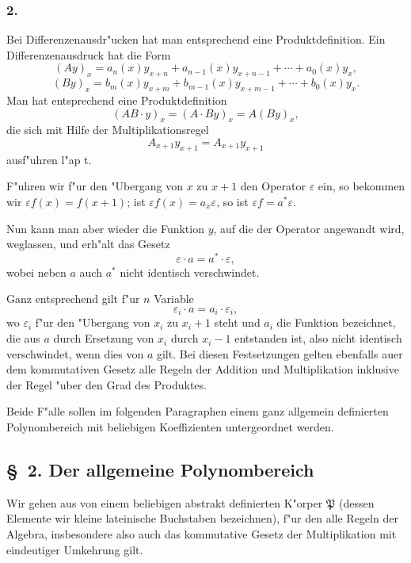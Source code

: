 \documentclass[12pt,a4paper]{article}
\begin{document}
\subsubsection*{2.}

Bei Differenzenausdr"ucken hat man entsprechend eine Produktdefinition. Ein Differenzenausdruck hat die Form
\[
(Ay)_x = a_n(x) y_{x+n} + a_{n-1}(x) y_{x+n-1} + \cdots + a_0(x) y_x,
\]
\[
(By)_x = b_m(x) y_{x+m} + b_{m-1}(x) y_{x+m-1} + \cdots + b_0(x) y_x.
\]
Man hat entsprechend eine Produktdefinition
\begin{equation}
(AB\cdot y)_x = (A\cdot By)_x = A(By)_x,
\end{equation}
die sich mit Hilfe der Multiplikationsregel
\[
A_{x+1} y_{x+1} = A_{x+1} y_{x+1}
\]
ausf"uhren l"ap t.

F"uhren wir f"ur den "Ubergang von $x$ zu $x+1$ den Operator $\varepsilon$ ein, so bekommen wir $\varepsilon f(x) = f(x+1)$; ist $\varepsilon f(x) = a_x \varepsilon$, so ist $\varepsilon f = a^* \varepsilon$.

Nun kann man aber wieder die Funktion $y$, auf die der Operator angewandt wird, weglassen, und erh"alt das Gesetz
\begin{equation}
\varepsilon \cdot a = a^* \cdot \varepsilon, \tag{$3'$}
\end{equation}
wobei neben $a$ auch $a^*$ nicht identisch verschwindet.

Ganz entsprechend gilt f"ur $n$ Variable
\begin{equation}
\varepsilon_i \cdot a = a_i \cdot \varepsilon_i, \tag{4}
\end{equation}
wo $\varepsilon_i$ f"ur den "Ubergang von $x_i$ zu $x_i+1$ steht und $a_i$ die Funktion bezeichnet, die aus $a$ durch Ersetzung von $x_i$ durch $x_i-1$ entstanden ist, also nicht identisch verschwindet, wenn dies von $a$ gilt. Bei diesen Festsetzungen gelten ebenfalls auer dem kommutativen Gesetz alle Regeln der Addition und Multiplikation inklusive der Regel "uber den Grad des Produktes.

Beide F"alle sollen im folgenden Paragraphen einem ganz allgemein definierten Polynombereich mit beliebigen Koeffizienten untergeordnet werden.

\subsection*{\S\ 2. Der allgemeine Polynombereich}

Wir gehen aus von einem beliebigen abstrakt definierten K"orper $\mathfrak{P}$ (dessen Elemente wir kleine lateinische Buchstaben bezeichnen), f"ur den alle Regeln der Algebra, insbesondere also auch das kommutative Gesetz der Multiplikation mit eindeutiger Umkehrung gilt.
\end{document}
